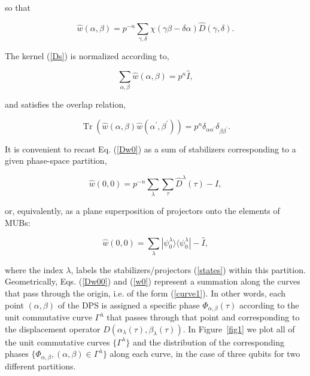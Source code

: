 \documentclass[quantumrep,article,submit,pdftex,moreauthors]{Definitions/mdpi}
\DeclareMathOperator{\Tr}{Tr}
\begin{document}
so that

\begin{equation}
  \hat{w} \left( \alpha,\beta \right)
  = p^{-n} \sum_{\gamma,\delta}
  \chi(\gamma\beta-\delta\alpha) \hat{D}(\gamma,\delta).
  \label{wabD}
\end{equation}

The kernel (\ref{Ds}) is normalized according to,

\begin{equation}
  \sum_{\alpha,\beta}\hat{w}\left(\alpha,\beta\right)
  = p^{n}\hat{I},
\end{equation}

and satisfies the overlap relation,

\begin{equation}
  \Tr\left(\hat{w}(\alpha,\beta)\hat{w}(\alpha^{\prime},\beta^{\prime})\right)
  = p^{n} \delta_{\alpha \alpha^{\prime}} \delta_{\beta\beta^{\prime}}.
\end{equation}

It is convenient to recast Eq. (\ref{Dw0}) as a sum of stabilizers corresponding
to a given phase-space partition,

\begin{equation}
  \hat{w}\left(0,0\right)
  = p^{-n} \sum_{\lambda} \sum_{\tau} \hat{D}^{\lambda}(\tau)-\hat{I},
  \label{Dw00}
\end{equation}

or, equivalently, as a plane superposition of projectors onto the elements of
MUBs:

\begin{equation}
  \hat{w}\left( 0,0\right)
  = \sum_{\lambda} |\psi_{0}^{\lambda}\rangle
  \langle \psi_{0}^{\lambda}| - \hat{I},
  \label{w0}
\end{equation}

where the index $\lambda$, labels the stabilizers/projectors (\ref{states})
within this partition. Geometrically, Eqs. (\ref{Dw00}) and (\ref{w0}) represent
a summation along the curves that pass through the origin, i.e. of the form
(\ref{curve1}). In other words, each point $(\alpha,\beta)$ of the DPS is
assigned a specific phase $\Phi_{\alpha, \beta}\left( \tau \right)$ according to
the unit commutative curve $\Gamma^{\lambda}$ that passes through that point and
corresponding to the displacement operator
$D\left(\alpha_{\lambda}(\tau),\beta_{\lambda}(\tau)\right)$.  In
Figure~\ref{fig1} we plot all of the unit commutative curves
$\{\Gamma^{\lambda}\}$ and the distribution of the corresponding phases
$\{\Phi_{\alpha,\beta},(\alpha,\beta) \in \Gamma^{\lambda}\}$ along each curve,
in the case of three qubits for two different partitions.
\end{document}
